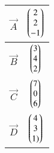 \begin{tabular}{|c|c|}
\hline
$\vec{A}$ & $\begin{pmatrix}2\\2\\-1\end{pmatrix}$\\
\hline
$\vec{B}$& $\begin{pmatrix}3\\4\\2\end{pmatrix}$\\
\hline
	$\vec{C}$ & $\begin{pmatrix}7\\0\\6\end{pmatrix}$\\
	\hline
$\vec{D}$ & $\begin{pmatrix}4\\3\\1)\end{pmatrix}$\\
\hline
\end{tabular}
